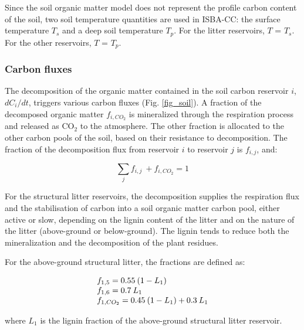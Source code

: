 {Since the soil organic matter model does not represent the profile
carbon content of the soil, two soil temperature quantities are used in ISBA-CC: 
the surface temperature $T_s$ 
and a deep soil temperature $T_p$. 
For the litter reservoirs, $T$ = $T_s$.
For the other reservoirs, $T$ = $T_p$.


\subsubsection{Carbon fluxes}

The  decomposition of the organic matter contained in the soil carbon reservoir $i$, 
$dC_i/dt$, 
triggers various carbon fluxes (Fig. \ref{fig_soil}).
A fraction of the decomposed organic matter $f_{i,CO_2}$ is mineralized through the respiration process 
and released as CO$_2$ to the atmosphere. 
The other fraction is allocated to the other carbon pools of the soil, based on their 
resistance to decomposition. The fraction of the decomposition flux from reservoir $i$ 
to reservoir $j$ is $f_{i,j}$, and:


\begin{equation}
\sum_j f_{i,j}\ + f_{i,CO_2} = 1
\end{equation}


For the structural litter reservoirs, the decomposition supplies the respiration flux 
and the stabilisation of carbon into a soil organic matter carbon pool, either active or slow, 
depending on the lignin content of the litter and on the nature of the litter (above-ground or below-ground).
The lignin tends to reduce both the mineralization and the decomposition of the plant residues.

For the above-ground structural litter, the fractions are defined as:

\begin{equation}
\begin{tabular}{l}
$ f_{1,5} = 0.55 \: ( 1 - L_1 ) $ \\
$ f_{1,6} = 0.7 \: L_1 $ \\
$ f_{1,CO_2} = 0.45 \: ( 1 - L_1 ) + 0.3 \: L_1 $ \\
\end{tabular}
\end{equation}

where $L_1$ is the lignin fraction of the above-ground structural litter reservoir.

}
